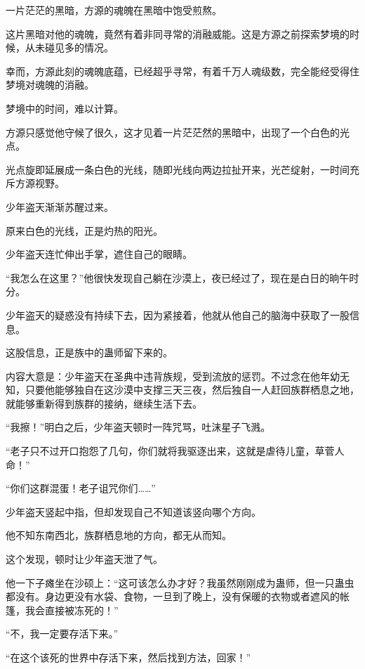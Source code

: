
\begin{this_body}



一片茫茫的黑暗，方源的魂魄在黑暗中饱受煎熬。

这片黑暗对他的魂魄，竟然有着非同寻常的消融威能。这是方源之前探索梦境的时候，从未碰见多的情况。

幸而，方源此刻的魂魄底蕴，已经超乎寻常，有着千万人魂级数，完全能经受得住梦境对魂魄的消融。

梦境中的时间，难以计算。

方源只感觉他守候了很久，这才见着一片茫茫然的黑暗中，出现了一个白色的光点。

光点旋即延展成一条白色的光线，随即光线向两边拉扯开来，光芒绽射，一时间充斥方源视野。

少年盗天渐渐苏醒过来。

原来白色的光线，正是灼热的阳光。

少年盗天连忙伸出手掌，遮住自己的眼睛。

“我怎么在这里？”他很快发现自己躺在沙漠上，夜已经过了，现在是白日的晌午时分。

少年盗天的疑惑没有持续下去，因为紧接着，他就从他自己的脑海中获取了一股信息。

这股信息，正是族中的蛊师留下来的。

内容大意是：少年盗天在圣典中违背族规，受到流放的惩罚。不过念在他年幼无知，只要他能够独自在这沙漠中支撑三天三夜，然后独自一人赶回族群栖息之地，就能够重新得到族群的接纳，继续生活下去。

“我擦！”明白之后，少年盗天顿时一阵咒骂，吐沫星子飞溅。

“老子只不过开口抱怨了几句，你们就将我驱逐出来，这就是虐待儿童，草菅人命！”

“你们这群混蛋！老子诅咒你们……”

少年盗天竖起中指，但却发现自己不知道该竖向哪个方向。

他不知东南西北，族群栖息地的方向，都无从而知。

这个发现，顿时让少年盗天泄了气。

他一下子瘫坐在沙硕上：“这可该怎么办才好？我虽然刚刚成为蛊师，但一只蛊虫都没有。身边更没有水袋、食物，一旦到了晚上，没有保暖的衣物或者遮风的帐篷，我会直接被冻死的！”

“不，我一定要存活下来。”

“在这个该死的世界中存活下来，然后找到方法，回家！”


\end{this_body}
